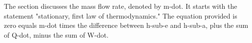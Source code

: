 The section discusses the mass flow rate, denoted by m-dot. It starts with the statement "stationary, first law of thermodynamics." The equation provided is zero equals m-dot times the difference between h-sub-e and h-sub-a, plus the sum of Q-dot, minus the sum of W-dot.